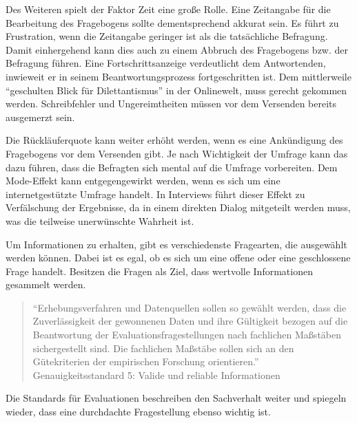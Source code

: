 Des Weiteren spielt der Faktor Zeit eine große Rolle. 
Eine Zeitangabe für die Bearbeitung des Fragebogens sollte dementsprechend akkurat sein.
Es führt zu Frustration, wenn die Zeitangabe geringer ist als die tatsächliche Befragung.
Damit einhergehend kann dies auch zu einem Abbruch des Fragebogens bzw. der Befragung führen. 
Eine Fortschrittsanzeige verdeutlicht dem Antwortenden, inwieweit er in seinem Beantwortungsprozess fortgeschritten ist. 
Dem mittlerweile \enquote{geschulten Blick für Dilettantismus} in der Onlinewelt, muss gerecht gekommen werden.
Schreibfehler und Ungereimtheiten müssen vor dem Versenden bereits ausgemerzt sein.\autocite[Siehe][S. 37]{2009Fragebogen} %

Die Rückläuferquote kann weiter erhöht werden, wenn es eine Ankündigung des Fragebogens vor dem Versenden gibt. 
Je nach Wichtigkeit der Umfrage kann das dazu führen, dass die Befragten sich mental auf die Umfrage vorbereiten.\autocite[Vgl.][S. 38]{Umfragenforschung}
Dem Mode-Effekt kann entgegengewirkt werden, wenn es sich um eine internetgestützte Umfrage handelt.
In Interviews führt dieser Effekt zu Verfälschung der Ergebnisse, da in einem direkten Dialog mitgeteilt werden muss, was die teilweise unerwünschte Wahrheit ist.\autocite[Vgl.][S. 163]{Umfragenforschung}
 
Um Informationen zu erhalten, gibt es verschiedenste Fragearten, die ausgewählt werden können.
Dabei ist es egal, ob es sich um eine offene oder eine geschlossene Frage handelt.\autocite[Vgl.][S. 31]{2009Fragebogen} %
Besitzen die Fragen als Ziel, dass wertvolle Informationen gesammelt werden.

\begin{quote} \enquote{Erhebungsverfahren und Datenquellen sollen so gewählt werden, dass die Zuverlässigkeit der gewonnenen Daten und ihre Gültigkeit bezogen auf die Beantwortung der Evaluationsfragestellungen nach fachlichen Maßstäben sichergestellt sind. Die fachlichen Maßstäbe sollen sich an den Gütekriterien der empirischen Forschung orientieren.} Genauigkeitsstandard 5: Valide und reliable Informationen\autocite[Siehe][]{DegEval} %
\end{quote}

Die Standards für Evaluationen beschreiben den Sachverhalt weiter und spiegeln wieder, dass eine durchdachte Fragestellung ebenso wichtig ist.

